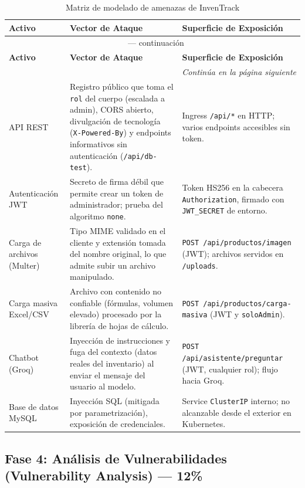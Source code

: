 \documentclass[stu,11pt,spanish,floatsintext]{apa7}
\begin{document}
\begin{longtable}{@{}p{} p{} p{}@{}}
  \caption{Matriz de modelado de amenazas de InvenTrack}
  \label{tab:threatmodel} \\
  \toprule
  \textbf{Activo} & \textbf{Vector de Ataque} & \textbf{Superficie de Exposición} \\
  \midrule
  \endfirsthead
  \multicolumn{3}{c}{\tablename\ \thetable{} — continuación} \\
  \toprule
  \textbf{Activo} & \textbf{Vector de Ataque} & \textbf{Superficie de Exposición} \\
  \midrule
  \endhead
  \midrule
  \multicolumn{3}{r}{\textit{Continúa en la página siguiente}} \\
  \endfoot
  \bottomrule
  \endlastfoot
  API REST & Registro público que toma el \texttt{rol} del cuerpo (escalada a admin), CORS abierto, divulgación de tecnología (\texttt{X-Powered-By}) y endpoints informativos sin autenticación (\texttt{/api/db-test}). & Ingress \texttt{/api/*} en HTTP; varios endpoints accesibles sin token. \\
  Autenticación JWT & Secreto de firma débil que permite crear un token de administrador; prueba del algoritmo \texttt{none}. & Token HS256 en la cabecera \texttt{Authorization}, firmado con \texttt{JWT\_SECRET} de entorno. \\
  Carga de archivos (Multer) & Tipo MIME validado en el cliente y extensión tomada del nombre original, lo que admite subir un archivo manipulado. & \texttt{POST /api/productos/imagen} (JWT); archivos servidos en \texttt{/uploads}. \\
  Carga masiva Excel/CSV & Archivo con contenido no confiable (fórmulas, volumen elevado) procesado por la librería de hojas de cálculo. & \texttt{POST /api/productos/carga-masiva} (JWT y \texttt{soloAdmin}). \\
  Chatbot (Groq) & Inyección de instrucciones y fuga del contexto (datos reales del inventario) al enviar el mensaje del usuario al modelo. & \texttt{POST /api/asistente/preguntar} (JWT, cualquier rol); flujo hacia Groq. \\
  Base de datos MySQL & Inyección SQL (mitigada por parametrización), exposición de credenciales. & Service \texttt{ClusterIP} interno; no alcanzable desde el exterior en Kubernetes. \\
\end{longtable}

\subsection{Fase 4: Análisis de Vulnerabilidades (Vulnerability Analysis) — 12\%}
\end{document}
